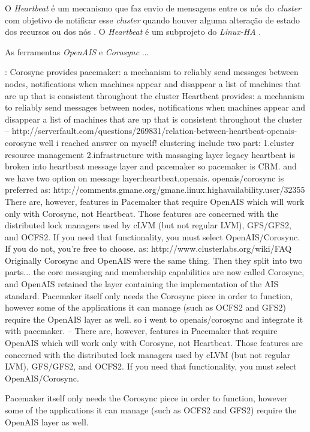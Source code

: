 O \textit{Heartbeat} é um mecanismo que faz envio de mensagens entre os nós do \textit{cluster} com objetivo de notificar esse 
\textit{cluster} quando houver alguma alteração de estado dos recursos ou dos nós \cite{clusterlabs}. O \textit{Heartbeat} é um subprojeto do
\textit{Linux-HA} \cite{linuxha}.

As ferramentas \textit{OpenAIS} e \textit{Corosync} ...

\cite{clusterlabs}:
Corosync provides pacemaker:
a mechanism to reliably send messages between nodes,
notifications when machines appear and disappear
a list of machines that are up that is consistent throughout the cluster 
Heartbeat provides:
a mechanism to reliably send messages between nodes,
notifications when machines appear and disappear
a list of machines that are up that is consistent throughout the cluster 
--
http://serverfault.com/questions/269831/relation-between-heartbeat-openais-corosync
well i reached answer on myself! clustering include two part:
1.cluster resource management
2.infrastructure with massaging layer
legacy heartbeat is broken into heartbeat message layer and pacemaker so pacemaker is CRM.
and we have two option on message layer:heartbeat,openais. openais/corosync is preferred as: http://comments.gmane.org/gmane.linux.highavailability.user/32355
There are, however, features in Pacemaker that require OpenAIS which will work only with Corosync, not Heartbeat. Those features are concerned 
with the distributed lock managers used by cLVM (but not regular LVM), GFS/GFS2, and OCFS2. If you need that functionality, you must select 
OpenAIS/Corosync. If you do not, you're free to choose.
as: http://www.clusterlabs.org/wiki/FAQ
Originally Corosync and OpenAIS were the same thing. Then they split into two parts... the core messaging and membership capabilities are now 
called Corosync, and OpenAIS retained the layer containing the implementation of the AIS standard.
Pacemaker itself only needs the Corosync piece in order to function, however some of the applications it can manage (such as OCFS2 and GFS2) 
require the OpenAIS layer as well.
so i went to openais/corosync and integrate it with pacemaker.
--
There are, however, features in Pacemaker that require OpenAIS which
will work only with Corosync, not Heartbeat. Those features are
concerned with the distributed lock managers used by cLVM (but not
regular LVM), GFS/GFS2, and OCFS2. If you need that functionality, you
must select OpenAIS/Corosync.

Pacemaker itself only needs the Corosync piece in order to function, however some of the applications it can manage 
(such as OCFS2 and GFS2) require the OpenAIS layer as well. 

